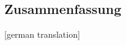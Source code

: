\newpage
\begin{otherlanguage}{ngerman}
\chapter*{Zusammenfassung}
[german translation]
\end{otherlanguage}


\endgroup

\vfill
